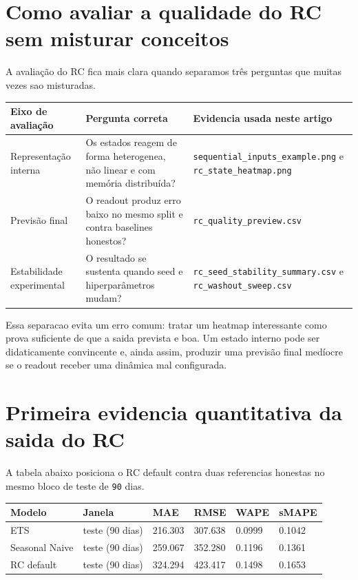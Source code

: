 \documentclass[12pt]{article}
\begin{document}
\section{Como avaliar a qualidade do RC sem misturar conceitos}\label{9-como-avaliar-a-qualidade-do-rc-sem-misturar-conceitos}

A avaliação do RC fica mais clara quando separamos três perguntas que muitas vezes sao misturadas.

\begin{longtable}[]{@{}lll@{}}
\toprule\noalign{}
Eixo de avaliação & Pergunta correta & Evidencia usada neste artigo \\
\midrule\noalign{}
\endhead
\bottomrule\noalign{}
\endlastfoot
Representação interna & Os estados reagem de forma heterogenea, não linear e com memória distribuída? & \texttt{sequential\_inputs\_example.png} e \texttt{rc\_state\_heatmap.png} \\
Previsão final & O readout produz erro baixo no mesmo split e contra baselines honestos? & \texttt{rc\_quality\_preview.csv} \\
Estabilidade experimental & O resultado se sustenta quando seed e hiperparâmetros mudam? & \texttt{rc\_seed\_stability\_summary.csv} e \texttt{rc\_washout\_sweep.csv} \\
\end{longtable}

Essa separacao evita um erro comum: tratar um heatmap interessante como prova suficiente de que a saida prevista e boa. Um estado interno pode ser didaticamente convincente e, ainda assim, produzir uma previsão final medíocre se o readout receber uma dinâmica mal configurada.

\section{Primeira evidencia quantitativa da saida do RC}\label{10-primeira-evidencia-quantitativa-da-saida-do-rc}

A tabela abaixo posiciona o RC default contra duas referencias honestas no mesmo bloco de teste de \texttt{90} dias.

\begin{longtable}[]{@{}llllll@{}}
\toprule\noalign{}
Modelo & Janela & MAE & RMSE & WAPE & sMAPE \\
\midrule\noalign{}
\endhead
\bottomrule\noalign{}
\endlastfoot
ETS & teste (90 dias) & 216.303 & 307.638 & 0.0999 & 0.1042 \\
Seasonal Naive & teste (90 dias) & 259.067 & 352.280 & 0.1196 & 0.1361 \\
RC default & teste (90 dias) & 324.294 & 423.417 & 0.1498 & 0.1653 \\
\end{longtable}
\end{document}
